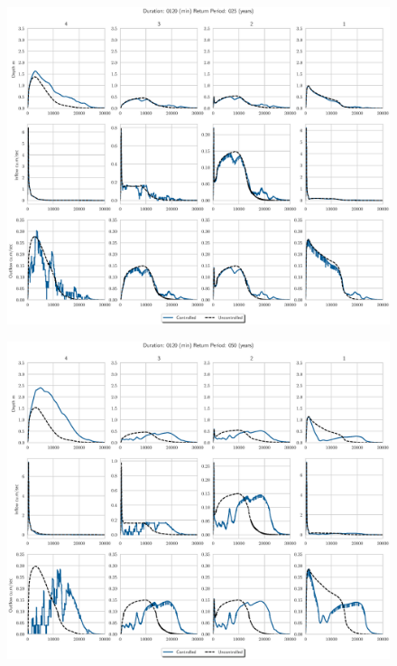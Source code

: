 \begin{figure}
    \centering
    \includegraphics[width=\linewidth]{./RL-SI-figures/77storms/0120025.eps}
\end{figure}
\begin{figure}
    \centering
    \includegraphics[width=\linewidth]{./RL-SI-figures/77storms/0120050.eps}
\end{figure}
